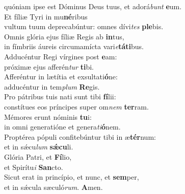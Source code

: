 \oddverse quóniam ipse est Dóminus Deus tuus, et adorá\textit{bunt} \textbf{e}um.\\
\evenverse Et fíliæ Tyri in mu\textbf{né}ribus~\*\\
\evenverse vultum tuum deprecabúntur: omnes dívi\textit{tes} \textbf{ple}bis.\\
\oddverse Omnis glória ejus fíliæ Regis ab \textbf{in}tus,~\*\\
\oddverse in fímbriis áureis circumamícta vari\textit{e}\textbf{tá}\textbf{ti}bus.\\
\evenverse Adducéntur Regi vírgines post \textbf{e}am:~\*\\
\evenverse próximæ ejus afferén\textit{tur} \textbf{ti}bi.\\
\oddverse Afferéntur in lætítia et exsultati\textbf{ó}ne:~\*\\
\oddverse adducéntur in tem\textit{plum} \textbf{Re}gis.\\
\evenverse Pro pátribus tuis nati sunt tibi \textbf{fí}lii:~\*\\
\evenverse constítues eos príncipes super om\textit{nem} \textbf{ter}ram.\\
\oddverse Mémores erunt nóminis \textbf{tu}i:~\*\\
\oddverse in omni generatióne et genera\textit{ti}\textbf{ó}nem.\\
\evenverse Proptérea pópuli confitebúntur tibi in æ\textbf{tér}num:~\*\\
\evenverse et in sǽcu\textit{lum} \textbf{sǽ}\textbf{cu}li.\\
\oddverse Glória Patri, et \textbf{Fí}lio,~\*\\
\oddverse et Spirítu\textit{i} \textbf{San}cto.\\
\evenverse Sicut erat in princípio, et nunc, et \textbf{sem}per,~\*\\
\evenverse et in sǽcula sæculó\textit{rum}. \textbf{A}men.\\
